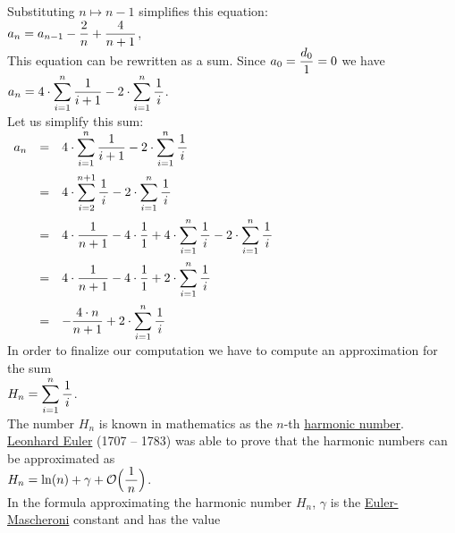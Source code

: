 Substituting $n \mapsto n-1$ simplifies this equation: 
\\[0.2cm]
\hspace*{1.3cm}
$\displaystyle a_{n} = a_{n-1} - \frac{2}{n} + \frac{4}{n+1}$,
\\[0.2cm] 
This equation can be rewritten as a sum.  Since $a_0 = \displaystyle\frac{d_0}{1} = 0$
we have
\\[0.2cm]
\hspace*{1.3cm}
$\displaystyle a_{n} = 4 \cdot \sum\limits_{i=1}^n \frac{1}{i+1} - 2 \cdot \sum\limits_{i=1}^n \frac{1}{\,i\,}$.  
\\[0.2cm]
Let us simplify this sum:
\\[0.2cm]
\hspace*{1.3cm}
$
\begin{array}{lcl}
 a_{n} & = & \displaystyle 4 \cdot \sum_{i=1}^n \frac{1}{i+1} - 2 \cdot \sum_{i=1}^n \frac{1}{\,i\,} \\[0.5cm]
       & = & \displaystyle 4 \cdot \sum_{i=2}^{n+1} \frac{1}{\,i\,} - 2 \cdot \sum_{i=1}^n \frac{1}{\,i\,} \\[0.5cm]
       & = & \displaystyle 4 \cdot \frac{1}{n+1} - 4 \cdot \frac{1}{1} + 4 \cdot \sum_{i=1}^{n} \frac{1}{\,i\,} - 2 \cdot \sum_{i=1}^n \frac{1}{\,i\,} \\[0.5cm]
       & = & \displaystyle 4 \cdot \frac{1}{n+1} - 4 \cdot \frac{1}{1} + 2 \cdot \sum_{i=1}^{n} \frac{1}{\,i\,}  \\[0.5cm]
       & = & \displaystyle - \frac{4 \cdot n}{n+1}  + 2 \cdot \sum_{i=1}^{n} \frac{1}{\,i\,}  
\end{array}
$
\\[0.2cm]
In order to finalize our computation we have to compute an approximation for the sum
\\[0.2cm]
\hspace*{1.3cm}
$H_n = \displaystyle\sum\limits_{i=1}^{n}\frac{1}{\,i\,}$.
\\[0.2cm] 
The number $H_n$ is known in mathematics as the $n$-th 
\href{http://en.wikipedia.org/wiki/Harmonic_number}{harmonic number}.
\href{http://en.wikipedia.org/wiki/Leonhard_Euler}{Leonhard Euler} (1707 -- 1783) was able to prove
that the harmonic numbers can be approximated as
\\[0.2cm]
\hspace*{1.3cm}
$\displaystyle H_n = \ln(n) + \gamma + \mathcal{O}\Bigl(\frac{1}{\,n\,}\Bigr)$. 
\\[0.2cm] 
In the formula approximating the harmonic number $H_n$, $\gamma$ is the
\href{http://en.wikipedia.org/wiki/Euler-Mascheroni_constant}{Euler-Mascheroni} constant and has the 
value
\\[0.2cm]

